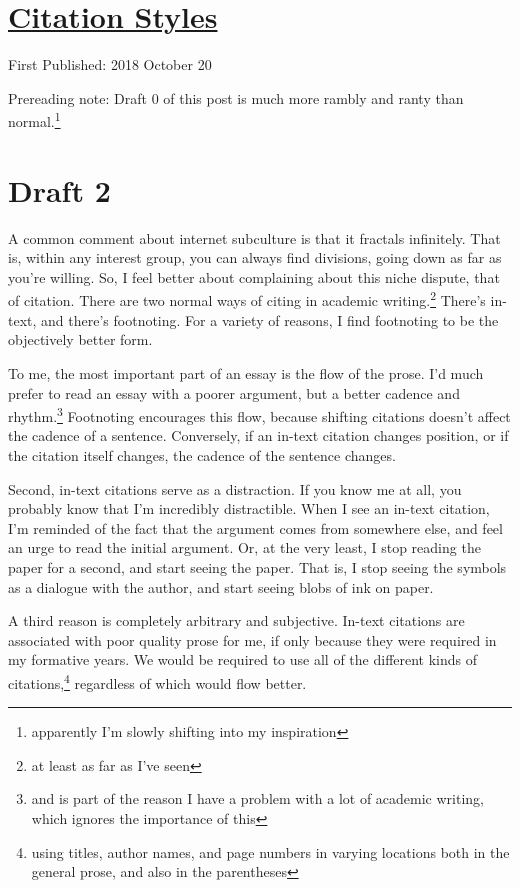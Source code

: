 \documentclass[12pt]{article}[titlepage]
\newcommand{\1}{\={a}}
\newcommand{\2}{\={e}}
\newcommand{\3}{\={\i}}
\newcommand{\4}{\=o}
\newcommand{\5}{\=u}
\newcommand{\6}{\={A}}
\renewcommand{\,}{\textsuperscript{,}}
\begin{document}
\doublespacing
\section{\href{citations.html}{Citation Styles}}
First Published: 2018 October 20

Prereading note: Draft 0 of this post is much more rambly and ranty than normal.\footnote{apparently I'm slowly shifting into my inspiration}

\section{Draft 2}
A common comment about internet subculture is that it fractals infinitely.
That is, within any interest group, you can always find divisions, going down as far as you're willing.
So, I feel better about complaining about this niche dispute, that of citation.
There are two normal ways of citing in academic writing.\footnote{at least as far as I've seen}
There's in-text, and there's footnoting.
For a variety of reasons, I find footnoting to be the objectively better form.

To me, the most important part of an essay is the flow of the prose.
I'd much prefer to read an essay with a poorer argument, but a better cadence and rhythm.\footnote{and is part of the reason I have a problem with a lot of academic writing, which ignores the importance of this}
Footnoting encourages this flow, because shifting citations doesn't affect the cadence of a sentence.
Conversely, if an in-text citation changes position, or if the citation itself changes, the cadence of the sentence changes.

Second, in-text citations serve as a distraction.
If you know me at all, you probably know that I'm incredibly distractible.
When I see an in-text citation, I'm reminded of the fact that the argument comes from somewhere else, and feel an urge to read the initial argument.
Or, at the very least, I stop reading the paper for a second, and start seeing the paper.
That is, I stop seeing the symbols as a dialogue with the author, and start seeing blobs of ink on paper.

A third reason is completely arbitrary and subjective.
In-text citations are associated with poor quality prose for me, if only because they were required in my formative years.
We would be required to use all of the different kinds of citations,\footnote{using titles, author names, and page numbers in varying locations both in the general prose, and also in the parentheses} regardless of which would flow better.
\end{document}
